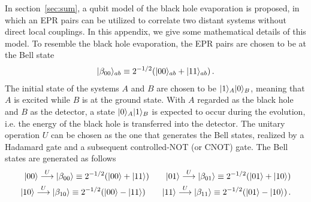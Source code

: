 \documentclass[12pt,a4paper]{article}
\begin{document}
In section~\ref{sec:sum}, a qubit model of the black hole evaporation is proposed, in which an EPR pairs can be utilized to correlate two distant systems without direct local couplings. In this appendix, we give some mathematical details of this model. To resemble the black hole evaporation, the EPR pairs are chosen to be at the Bell state
\begin{equation}
\label{eq:112}
\begin{split}
\arrowvert \beta_{00}\rangle_{ab}\equiv2^{-1/2}(\arrowvert
00\rangle_{ab}+\arrowvert 11\rangle_{ab}) \,.
\end{split}
\end{equation}
The initial state of the systems $A$ and $B$ are chosen to be
$\arrowvert 1\rangle_A\arrowvert 0\rangle_B$, meaning that $A$ is
excited while $B$ is at the ground state. With $A$ regarded as
the black hole and $B$ as the detector, a state
$\arrowvert 0\rangle_A\arrowvert 1\rangle_B$ is expected to occur during the evolution,
i.e. the energy of the black hole is transferred into
the detector. The unitary operation $U$ can be chosen as the one that generates the Bell states, realized by a Hadamard gate and a subsequent controlled-NOT (or CNOT) gate. The Bell states are generated as follows~\cite{n}
\begin{equation}
\label{eq:113}
\begin{split}
\arrowvert 00\rangle\stackrel{U}{\longrightarrow}\arrowvert
\beta_{00}\rangle\equiv 2^{-1/2}(\arrowvert 00\rangle+\arrowvert
11\rangle)\qquad \arrowvert
01\rangle\stackrel{U}{\longrightarrow}\arrowvert
\beta_{01}\rangle\equiv 2^{-1/2}(\arrowvert 01\rangle+\arrowvert
10\rangle) \\ \arrowvert
10\rangle\stackrel{U}{\longrightarrow}\arrowvert
\beta_{10}\rangle\equiv 2^{-1/2}(\arrowvert 00\rangle-\arrowvert
11\rangle)\qquad \arrowvert
11\rangle\stackrel{U}{\longrightarrow}\arrowvert
\beta_{11}\rangle\equiv 2^{-1/2}(\arrowvert 01\rangle-\arrowvert
10\rangle) \,.
\end{split}
\end{equation}
\end{document}
